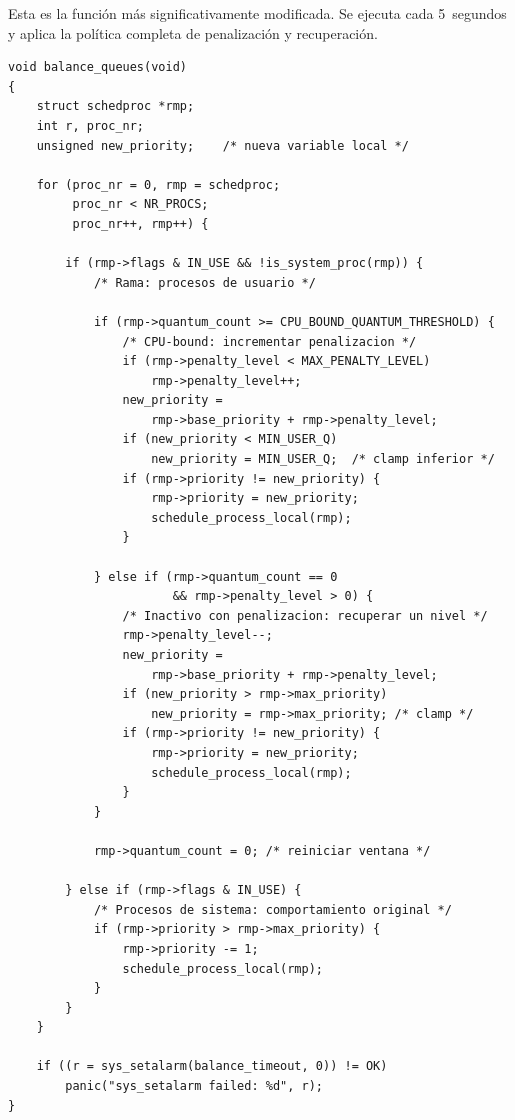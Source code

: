 \documentclass[11pt,a4paper]{article}
\begin{document}
Esta es la funci\'on m\'as significativamente modificada. Se ejecuta cada 5~segundos y
aplica la pol\'itica completa de penalizaci\'on y recuperaci\'on.

\begin{lstlisting}[style=cstyle,caption={Nueva implementaci\'on de \texttt{balance\_queues()}}]
void balance_queues(void)
{
    struct schedproc *rmp;
    int r, proc_nr;
    unsigned new_priority;    /* nueva variable local */

    for (proc_nr = 0, rmp = schedproc;
         proc_nr < NR_PROCS;
         proc_nr++, rmp++) {

        if (rmp->flags & IN_USE && !is_system_proc(rmp)) {
            /* Rama: procesos de usuario */

            if (rmp->quantum_count >= CPU_BOUND_QUANTUM_THRESHOLD) {
                /* CPU-bound: incrementar penalizacion */
                if (rmp->penalty_level < MAX_PENALTY_LEVEL)
                    rmp->penalty_level++;
                new_priority =
                    rmp->base_priority + rmp->penalty_level;
                if (new_priority < MIN_USER_Q)
                    new_priority = MIN_USER_Q;  /* clamp inferior */
                if (rmp->priority != new_priority) {
                    rmp->priority = new_priority;
                    schedule_process_local(rmp);
                }

            } else if (rmp->quantum_count == 0
                       && rmp->penalty_level > 0) {
                /* Inactivo con penalizacion: recuperar un nivel */
                rmp->penalty_level--;
                new_priority =
                    rmp->base_priority + rmp->penalty_level;
                if (new_priority > rmp->max_priority)
                    new_priority = rmp->max_priority; /* clamp */
                if (rmp->priority != new_priority) {
                    rmp->priority = new_priority;
                    schedule_process_local(rmp);
                }
            }

            rmp->quantum_count = 0; /* reiniciar ventana */

        } else if (rmp->flags & IN_USE) {
            /* Procesos de sistema: comportamiento original */
            if (rmp->priority > rmp->max_priority) {
                rmp->priority -= 1;
                schedule_process_local(rmp);
            }
        }
    }

    if ((r = sys_setalarm(balance_timeout, 0)) != OK)
        panic("sys_setalarm failed: %d", r);
}
\end{lstlisting}
\end{document}
